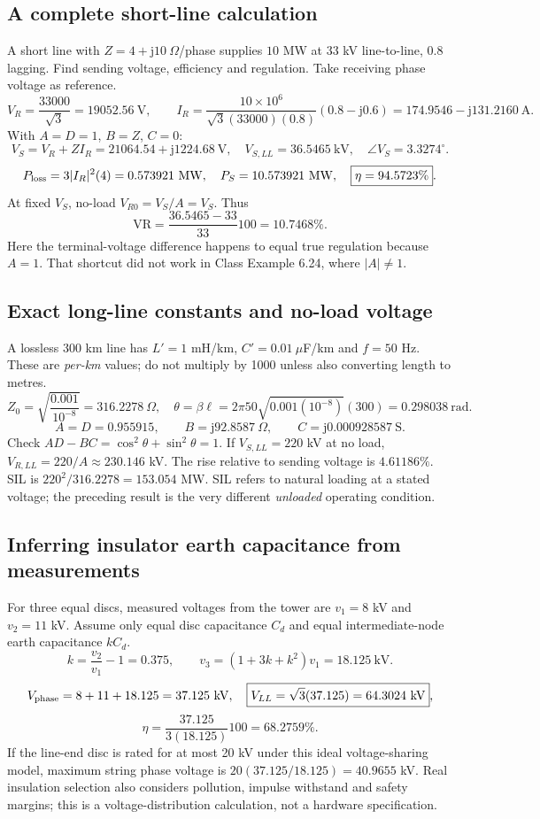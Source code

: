 \documentclass[11pt,a4paper]{article}
\newcommand{\ans}[1]{\boxed{#1}}
\newcommand{\jj}{\mathrm j}
\begin{document}
\subsection{A complete short-line calculation}
A short line with $Z=4+\jj10\ \Omega$/phase supplies $10$ MW at $33$ kV line-to-line, $0.8$ lagging. Find sending voltage, efficiency and regulation. Take receiving phase voltage as reference.
\[
 V_R=\frac{33000}{\sqrt3}=19052.56\ \mathrm V,\qquad
 I_R=\frac{10\times10^6}{\sqrt3(33000)(0.8)}(0.8-\jj0.6)
 =174.9546-\jj131.2160\ \mathrm A.
\]
With $A=D=1$, $B=Z$, $C=0$:
\[
 V_S=V_R+ZI_R=21064.54+\jj1224.68\ \mathrm V,
 \quad \ans{V_{S,LL}=36.5465\ \mathrm{kV}},\quad \angle V_S=3.3274^\circ.
\]
\[
 P_{\rm loss}=3|I_R|^2(4)=0.573921\ \mathrm{MW},\quad
 P_S=10.573921\ \mathrm{MW},\quad \ans{\eta=94.5723\%}.
\]
At fixed $V_S$, no-load $V_{R0}=V_S/A=V_S$. Thus
\[
 \ans{\mathrm{VR}=\frac{36.5465-33}{33}100=10.7468\%}.
\]
Here the terminal-voltage difference happens to equal true regulation because $A=1$. That shortcut did not work in Class Example 6.24, where $|A|\ne1$.

\subsection{Exact long-line constants and no-load voltage}
A lossless 300 km line has $L'=1$ mH/km, $C'=0.01\ \mu$F/km and $f=50$ Hz. These are \emph{per-km} values; do not multiply by 1000 unless also converting length to metres.
\[
 Z_0=\sqrt{\frac{0.001}{10^{-8}}}=316.2278\ \Omega,\quad
 \theta=\beta\ell=2\pi50\sqrt{0.001(10^{-8})}(300)=0.298038\ \mathrm{rad}.
\]
\[
 \ans{A=D=0.955915},\qquad
 \ans{B=\jj92.8587\ \Omega},\qquad
 \ans{C=\jj0.000928587\ \mathrm S}.
\]
Check $AD-BC=\cos^2\theta+\sin^2\theta=1$. If $V_{S,LL}=220$ kV at no load, $V_{R,LL}=220/A\approx230.146$ kV. The rise relative to sending voltage is $\ans{4.61186\%}$. SIL is $220^2/316.2278=153.054$ MW. SIL refers to natural loading at a stated voltage; the preceding result is the very different \emph{unloaded} operating condition.

\subsection{Inferring insulator earth capacitance from measurements}
For three equal discs, measured voltages from the tower are $v_1=8$ kV and $v_2=11$ kV. Assume only equal disc capacitance $C_d$ and equal intermediate-node earth capacitance $kC_d$.
\[
 k=\frac{v_2}{v_1}-1=0.375,\qquad
 v_3=(1+3k+k^2)v_1=18.125\ \mathrm{kV}.
\]
\[
 V_{\rm phase}=8+11+18.125=37.125\ \mathrm{kV},\quad
 \ans{V_{LL}=\sqrt3(37.125)=64.3024\ \mathrm{kV}},
\]
\[
 \ans{\eta=\frac{37.125}{3(18.125)}100=68.2759\%}.
\]
If the line-end disc is rated for at most 20 kV under this ideal voltage-sharing model, maximum string phase voltage is $20(37.125/18.125)=40.9655$ kV. Real insulation selection also considers pollution, impulse withstand and safety margins; this is a voltage-distribution calculation, not a hardware specification.
\end{document}
